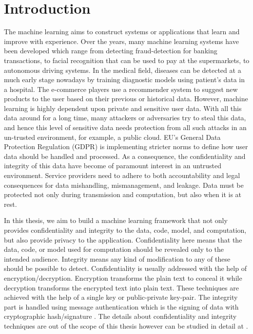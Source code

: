 \chapter{Introduction}
\label{sec:intro}
The machine learning \cite{65} aims to construct systems or applications that learn and improve with experience. Over the years, many machine learning systems have been developed which range from detecting fraud-detection \cite{56} for banking transactions, to facial recognition that can be used to pay at the supermarkets, to autonomous driving systems. In the medical field, diseases can be detected at a much early stage nowadays by training diagnostic models using patient's data in a hospital. The e-commerce players use a recommender system \cite{55} to suggest new products to the user based on their previous or historical data. However, machine learning is highly dependent upon private and sensitive user data. With all this data around for a long time, many attackers or adversaries try to steal this data, and hence this level of sensitive data needs protection from all such attacks in an un-trusted environment, for example, a public cloud. EU's General Data Protection Regulation (GDPR) \cite{57} is implementing stricter norms to define how user data should be handled and processed. As a consequence, the confidentiality and integrity of this data have become of paramount interest in an untrusted environment. Service providers need to adhere to both accountability and legal consequences for data mishandling, mismanagement, and leakage. Data must be protected not only during transmission and computation, but also when it is at rest.


In this thesis, we aim to build a machine learning framework that not only provides confidentiality and integrity to the data, code, model, and computation, but also provide privacy to the application. Confidentiality here means that the data, code, or model used for computation should be revealed only to the intended audience. Integrity means any kind of modification to any of these should be possible to detect. Confidentiality is usually addressed with the help of encryption/decryption. Encryption transforms the plain text to conceal it while decryption transforms the encrypted text into plain text. These techniques are achieved with the help of a single key or public-private key-pair. The integrity part is handled using message authentication which is the signing of data with cryptographic hash/signature \cite{58}. The details about confidentiality and integrity techniques are out of the scope of this thesis however can be studied in detail at \cite{58}.

